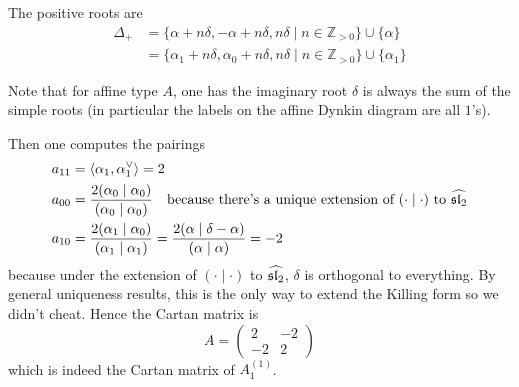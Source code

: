 \documentclass[12pt]{article}
\begin{document}
\begin{example}
    The positive roots are \begin{align*}
        \Delta_+ & = \{\alpha + n\delta, -\alpha + n\delta, n\delta \mid n \in \mathbb{Z}_{>0}\} \cup \{\alpha\}      \\
                 & = \{\alpha_1 + n\delta, \alpha_0 + n\delta, n\delta \mid n \in \mathbb{Z}_{>0}\} \cup \{\alpha_1\}
    \end{align*}

    Note that for affine type $A$, one has the imaginary root $\delta$ is always the sum of the simple roots (in particular the labels on the affine Dynkin diagram are all $1$'s).

    Then one computes the pairings \begin{align*}
        a_{11} & = \langle \alpha_1, \alpha_1^\vee \rangle = 2                                                                                                        \\
        a_{00} & = \frac{2(\alpha_0 \mid \alpha_0)}{(\alpha_0 \mid \alpha_0)} \texty{because there's a unique extension of $(\cdot \mid \cdot)$ to $\widehat{\sl_2}$} \\
        a_{10} & = \frac{2(\alpha_1 \mid \alpha_0)}{(\alpha_1 \mid \alpha_1)} = \frac{2(\alpha \mid \delta - \alpha)}{(\alpha \mid \alpha)} = -2                      \\
    \end{align*} because under the extension of $(\cdot \mid \cdot)$ to $\widehat{\sl_2}$, $\delta$ is orthogonal to everything. By general uniqueness results, this is the only way to extend the Killing form so we didn't cheat. Hence the Cartan matrix is \[
        A = \begin{pmatrix}
            2  & -2 \\
            -2 & 2
        \end{pmatrix}
    \] which is indeed the Cartan matrix of $A_1^{(1)}$.
\end{example}
\end{document}
